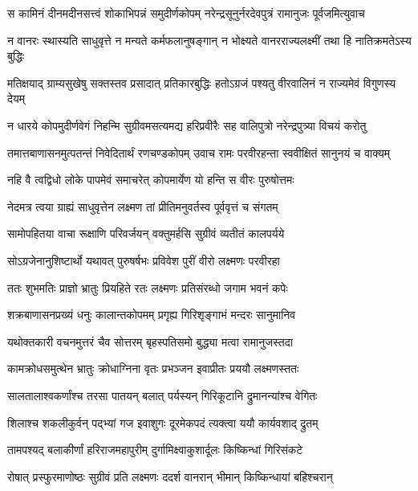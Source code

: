 
\twolineshloka
{स कामिनं दीनमदीनसत्त्वं शोकाभिपन्नं समुदीर्णकोपम्}
{नरेन्द्रसूनुर्नरदेवपुत्रं रामानुजः पूर्वजमित्युवाच} %

\twolineshloka
{न वानरः स्थास्यति साधुवृत्ते न मन्यते कर्मफलानुषङ्गान्}
{न भोक्ष्यते वानरराज्यलक्ष्मीं तथा हि नातिक्रमतेऽस्य बुद्धिः} %

\twolineshloka
{मतिक्षयाद् ग्राम्यसुखेषु सक्तस्तव प्रसादात् प्रतिकारबुद्धिः}
{हतोऽग्रजं पश्यतु वीरवालिनं न राज्यमेवं विगुणस्य देयम्} %

\twolineshloka
{न धारये कोपमुदीर्णवेगं निहन्मि सुग्रीवमसत्यमद्य}
{हरिप्रवीरैः सह वालिपुत्रो नरेन्द्रपुत्र्या विचयं करोतु} %

\twolineshloka
{तमात्तबाणासनमुत्पतन्तं निवेदितार्थं रणचण्डकोपम्}
{उवाच रामः परवीरहन्ता स्ववीक्षितं सानुनयं च वाक्यम्} %

\twolineshloka
{नहि वै त्वद्विधो लोके पापमेवं समाचरेत्}
{कोपमार्येण यो हन्ति स वीरः पुरुषोत्तमः} %

\twolineshloka
{नेदमत्र त्वया ग्राह्यं साधुवृत्तेन लक्ष्मण}
{तां प्रीतिमनुवर्तस्व पूर्ववृत्तं च संगतम्} %

\twolineshloka
{सामोपहितया वाचा रूक्षाणि परिवर्जयन्}
{वक्तुमर्हसि सुग्रीवं व्यतीतं कालपर्यये} %

\twolineshloka
{सोऽग्रजेनानुशिष्टार्थो यथावत् पुरुषर्षभः}
{प्रविवेश पुरीं वीरो लक्ष्मणः परवीरहा} %

\twolineshloka
{ततः शुभमतिः प्राज्ञो भ्रातुः प्रियहिते रतः}
{लक्ष्मणः प्रतिसंरब्धो जगाम भवनं कपेः} %

\twolineshloka
{शक्रबाणासनप्रख्यं धनुः कालान्तकोपमम्}
{प्रगृह्य गिरिशृङ्गाभं मन्दरः सानुमानिव} %

\twolineshloka
{यथोक्तकारी वचनमुत्तरं चैव सोत्तरम्}
{बृहस्पतिसमो बुद्ध्या मत्वा रामानुजस्तदा} %

\twolineshloka
{कामक्रोधसमुत्थेन भ्रातुः क्रोधाग्निना वृतः}
{प्रभञ्जन इवाप्रीतः प्रययौ लक्ष्मणस्ततः} %

\twolineshloka
{सालतालाश्वकर्णांश्च तरसा पातयन् बलात्}
{पर्यस्यन् गिरिकूटानि द्रुमानन्यांश्च वेगितः} %

\twolineshloka
{शिलाश्च शकलीकुर्वन् पद्भ्यां गज इवाशुगः}
{दूरमेकपदं त्यक्त्वा ययौ कार्यवशाद् द्रुतम्} %

\twolineshloka
{तामपश्यद् बलाकीर्णां हरिराजमहापुरीम्}
{दुर्गामिक्ष्वाकुशार्दूलः किष्किन्धां गिरिसंकटे} %

\twolineshloka
{रोषात् प्रस्फुरमाणोष्ठः सुग्रीवं प्रति लक्ष्मणः}
{ददर्श वानरान् भीमान् किष्किन्धायां बहिश्चरान्} %

